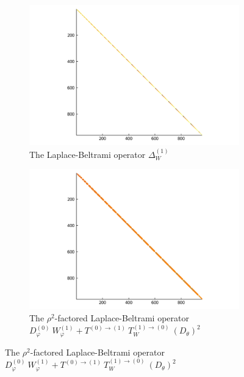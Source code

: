 \documentclass[11pt, oneside]{article}   	%
\begin{document}
\begin{figure}[tp]
	\centering %
	\begin{subfigure}{0.5\textwidth}
		\includegraphics[scale=0.5]{sparsity-of-laplacian}
		\centering
		\caption{The Laplace-Beltrami operator $\Delta^{(1)}_W$}
	\end{subfigure}\hfil %
	\begin{subfigure}{0.5\textwidth}
		\includegraphics[scale=0.5]{sparsity-of-rho2laplacian}
		\centering
		\caption{The $\rho^2$-factored Laplace-Beltrami operator $D_\varphi^{(0)} \: W_\varphi^{(1)} + T^{(0)\to(1)} \: T_W^{(1)\to(0)} \: (D_\theta)^2$}
	\end{subfigure}\hfil %


\end{figure}
\end{document}
